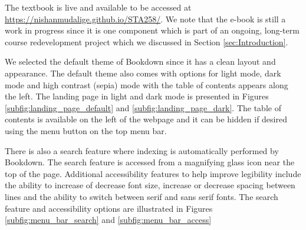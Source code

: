 \documentclass[11pt]{article}
\begin{document}
The textbook is live and available to be accessed at \href{https://nishanmudalige.github.io/STA258/}{https://nishanmudalige.github.io/STA258/}.
We note that the e-book is still a work in progress since it is one component which is part of an ongoing, long-term course redevelopment project which we discussed in Section \ref{sec:Introduction}.

We selected the default theme of Bookdown since it has a clean layout and appearance.
The default theme also comes with options for light mode, dark mode and high contrast (sepia) mode with the table of contents appears along the left.
The landing page in light and dark mode is presented in Figures \ref{subfig:landing_page_default} and \ref{subfig:landing_page_dark}.
The table of contents is available on the left of the webpage and it can be hidden if desired using the menu button on the top menu bar.

There is also a search feature where indexing is automatically performed by Bookdown. The search feature is accessed from a magnifying glass icon near the top of the page.
Additional accessibility features to help improve legibility include the ability to increase of decrease font size, increase or decrease spacing between lines and the ability to switch between serif and sans serif fonts. The search feature and accessibility options are illustrated in Figures \ref{subfig:menu_bar_search} and \ref{subfig:menu_bar_access}

\end{document}
